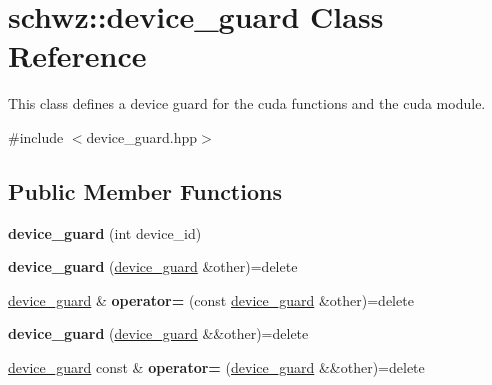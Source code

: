 \hypertarget{classschwz_1_1device__guard}{}\section{schwz\+:\+:device\+\_\+guard Class Reference}
\label{classschwz_1_1device__guard}


This class defines a device guard for the cuda functions and the cuda module.  




{\ttfamily \#include $<$device\+\_\+guard.\+hpp$>$}

\subsection*{Public Member Functions}
\begin{DoxyCompactItemize}
\item 
\mbox{\label{classschwz_1_1device__guard_a92b10bc6d8ddd6649dda3766e3daf711}} 
{\bfseries device\+\_\+guard} (int device\+\_\+id)
\item 
\mbox{\label{classschwz_1_1device__guard_a2de09b479828241b2c4a3411c958354c}} 
{\bfseries device\+\_\+guard} (\hyperlink{classschwz_1_1device__guard}{device\+\_\+guard} \&other)=delete
\item 
\mbox{\label{classschwz_1_1device__guard_abb46749c09498f2904342dd719451c5a}} 
\hyperlink{classschwz_1_1device__guard}{device\+\_\+guard} \& {\bfseries operator=} (const \hyperlink{classschwz_1_1device__guard}{device\+\_\+guard} \&other)=delete
\item 
\mbox{\label{classschwz_1_1device__guard_a193c151830543321a641a394099d2249}} 
{\bfseries device\+\_\+guard} (\hyperlink{classschwz_1_1device__guard}{device\+\_\+guard} \&\&other)=delete
\item 
\mbox{\label{classschwz_1_1device__guard_a54b270cdc45097eceedbc022bbbeed1b}} 
\hyperlink{classschwz_1_1device__guard}{device\+\_\+guard} const  \& {\bfseries operator=} (\hyperlink{classschwz_1_1device__guard}{device\+\_\+guard} \&\&other)=delete
\end{DoxyCompactItemize}


